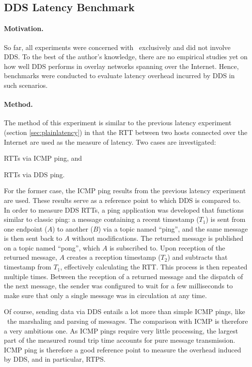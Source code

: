 \subsection{DDS Latency Benchmark} \label{sec:ddslatency}

\paragraph{Motivation.} So far, all experiments were concerned with \wnet\ exclusively and did not involve DDS. To the best of the author's knowledge, there are no empirical studies yet on how well DDS performs in overlay networks spanning over the Internet. Hence, benchmarks were conducted to evaluate latency overhead incurred by DDS in such scenarios.

\paragraph{Method.} The method of this experiment is similar to the previous latency experiment (section \ref{sec:plainlatency}) in that the RTT between two hosts connected over the Internet are used as the measure of latency. Two cases are investigated:
\begin{inparaenum}[(i)]
	\item RTTs via ICMP ping, and
	\item RTTs via DDS ping.
\end{inparaenum}
For the former case, the ICMP ping results from the previous latency experiment are used. These results serve as a reference point to which DDS is compared to. In order to measure DDS RTTs, a ping application was developed that functions similar to classic ping: a message containing a recent timestamp ($T_1$) is sent from one endpoint ($A$) to another ($B$) via a topic named ``ping'', and the same message is then sent back to $A$ without modifications. The returned message is published on a topic named ``pong'', which $A$ is subscribed to. Upon reception of the returned message, $A$ creates a reception timestamp ($T_2$) and subtracts that timestamp from $T_1$, effectively calculating the RTT. This process is then repeated multiple times. Between the reception of a returned message and the dispatch of the next message, the sender was configured to wait for a few milliseconds to make sure that only a single message was in circulation at any time.

Of course, sending data via DDS entails a lot more than simple ICMP pings, like \eg\ the marshaling and parsing of messages. The comparison with ICMP is therefore a very ambitious one. As ICMP pings require very little processing, the largest part of the measured round trip time accounts for pure message transmission. ICMP ping is therefore a good reference point to measure the overhead induced by DDS, and in particular, RTPS.

